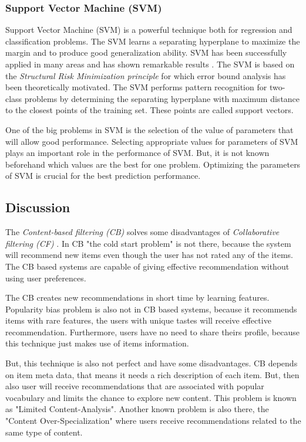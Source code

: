 \documentclass[conference]{IEEEtran}
\begin{document}
\subsubsection{Support Vector Machine (SVM)}\label{BB}
Support Vector Machine (SVM) is a powerful technique both for regression and classification problems. The SVM learns a separating hyperplane to maximize the margin and to produce good generalization ability. SVM has been successfully applied in many areas and has shown remarkable results \cite{b4}.
The SVM is based on the \textit{Structural Risk Minimization principle} for which error bound analysis has been theoretically motivated. The SVM performs pattern recognition for two-class problems by determining the separating hyperplane with maximum distance to the closest points of the training set. These points are called support vectors.

One of the big problems in SVM is the selection of the value of parameters that will allow good performance. Selecting appropriate values for parameters of SVM plays an important role in the performance of SVM. But, it is not known beforehand which values are the best for one problem. Optimizing the parameters of SVM is crucial for the best prediction performance\cite{b4}. 

\subsection{Discussion}\label{CC}
The \textit{Content-based filtering (CB)} solves some disadvantages of \textit{Collaborative filtering (CF)} . In CB "the cold start problem" is not there, because the system will recommend new items even though the user has not rated any of the items. The CB based systems are capable of giving effective recommendation without using user preferences.

The CB creates new recommendations in short time by learning features. Popularity bias problem is also not in CB based systems, because it recommends items with rare features, the users with unique tastes will receive effective recommendation. Furthermore, users have no need to share theirs profile, because this technique just makes use of items information.

But, this technique is also not perfect and have some disadvantages. CB depends on item meta data, that means it needs a rich description of each item. But, then also user will receive recommendations that are associated with popular vocabulary and limits the chance to explore new content. This problem is known as "Limited Content-Analysis". Another known problem is also there, the "Content Over-Specialization" where users receive recommendations related to the same type of content.
\end{document}
